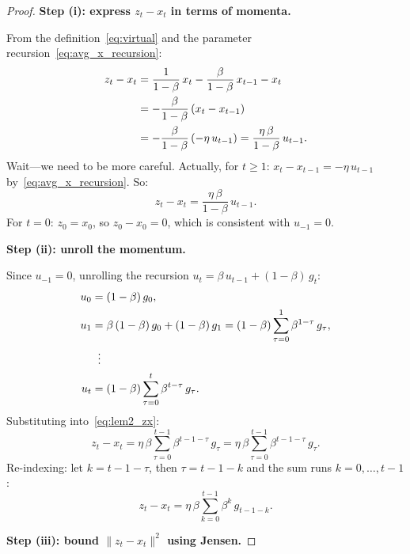 \documentclass{article}
\begin{document}
\begin{proof}
\noindent\textbf{Step (i): express $z_t - x_t$ in terms of momenta.}

From the definition~\eqref{eq:virtual} and the parameter
recursion~\eqref{eq:avg_x_recursion}:
\begin{align}
z_t - x_t
&= \frac{1}{1-\beta}\,x_t - \frac{\beta}{1-\beta}\,x_{t-1} - x_t
\notag \\
&= -\frac{\beta}{1-\beta}\,(x_t - x_{t-1})
\notag \\
&= -\frac{\beta}{1-\beta}\,(-\eta\,u_{t-1})
= \frac{\eta\,\beta}{1-\beta}\,u_{t-1}.
\label{eq:lem2_zx_raw}
\end{align}
Wait---we need to be more careful. Actually, for $t \geq 1$:
$x_t - x_{t-1} = -\eta\,u_{t-1}$ by~\eqref{eq:avg_x_recursion}. So:
\begin{equation}
z_t - x_t = \frac{\eta\,\beta}{1-\beta}\,u_{t-1}.
\label{eq:lem2_zx}
\end{equation}
For $t = 0$: $z_0 = x_0$, so $z_0 - x_0 = 0$, which is consistent with
$u_{-1} = 0$.

\medskip
\noindent\textbf{Step (ii): unroll the momentum.}

Since $u_{-1} = 0$, unrolling the recursion
$u_t = \beta\,u_{t-1} + (1-\beta)\,g_t$:
\begin{align}
u_0 &= (1-\beta)\,g_0, \notag \\
u_1 &= \beta\,(1-\beta)\,g_0 + (1-\beta)\,g_1
= (1-\beta)\sum_{\tau=0}^{1}\beta^{1-\tau}\,g_\tau, \notag \\
&\;\;\vdots \notag \\
u_t &= (1-\beta)\sum_{\tau=0}^{t}\beta^{t-\tau}\,g_\tau.
\label{eq:lem2_u_unrolled}
\end{align}
Substituting into~\eqref{eq:lem2_zx}:
\begin{equation}
z_t - x_t = \eta\,\beta\sum_{\tau=0}^{t-1}\beta^{t-1-\tau}\,g_\tau
= \eta\,\beta\sum_{\tau=0}^{t-1}\beta^{t-1-\tau}\,g_\tau.
\label{eq:lem2_zx_expanded}
\end{equation}
Re-indexing: let $k = t - 1 - \tau$, then $\tau = t - 1 - k$ and the sum runs
$k = 0, \ldots, t-1$:
\begin{equation}
z_t - x_t = \eta\,\beta\sum_{k=0}^{t-1}\beta^k\,g_{t-1-k}.
\label{eq:lem2_reindex}
\end{equation}

\medskip
\noindent\textbf{Step (iii): bound $\|z_t - x_t\|^2$ using Jensen.}


\end{proof}
\end{document}
